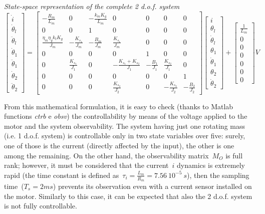 \textit{State-space representation of the complete 2 d.o.f. system}
\begin{equation}
	\begin{bmatrix}
		\dot{i} \\
		\dot{\theta}_l \\
		\ddot{\theta}_l \\
		\dot{\theta}_1 \\
		\ddot{\theta}_1 \\
		\dot{\theta}_2 \\
		\ddot{\theta}_2
	\end{bmatrix}
	=
	\begin{bmatrix}
		-\frac{R_m}{L_m} & 0 & -\frac{k_m K_g}{L_m} & 0 & 0 & 0 & 0 \\
		0 & 0 &1 & 0 & 0 & 0 & 0 \\
		\frac{\eta_m \eta_g k_t K_g}{J_m} & -\frac{K_{s_1}}{J_m} & -\frac{B_m}{J_m} & \frac{K_{s_1}}{J_m} & 0 & 0 & 0 \\
		0 & 0 & 0 & 0 & 1 & 0 & 0 \\
		0 & \frac{K_{s_1}}{J_1} & 0 & -\frac{K_{s_1}+K_{s_2}}{J_1} & -\frac{B_1}{J_1} & \frac{K_{s_2}}{J_1} & 0 \\
		0 & 0 & 0 & 0 & 0 & 0 & 1 \\
		0 & 0 & 0 & \frac{K_{s_2}}{J_2} & 0 & -\frac{K_{s_2}}{J_2} & -\frac{B_2}{J_2}
	\end{bmatrix}
	\begin{bmatrix}
		i \\
		\theta_l \\
		\dot{\theta}_l \\
		\theta_1 \\
		\dot{\theta}_1 \\
		\theta_2 \\
		\dot{\theta}_2
	\end{bmatrix}
	+
	\begin{bmatrix}
		\frac{1}{L_m} \\
		0 \\
		0 \\
		0 \\
		0 \\
		0 \\
		0
	\end{bmatrix}
	V
\end{equation}

From this mathematical formulation, it is easy to check (thanks to Matlab functions  \textit{ctrb} e \textit{obsv}) the controllability by means of the voltage applied to the motor and the system observability.
The system having just one rotating mass (i.e. 1 d.o.f. system) is controllable only in two state variables over five: surely, one of those is the current (directly affected by the input), the other is one among the remaining. On the other hand, the observability matrix~$M_O$ is full rank; however, it must be considered that the current~$i$ dynamics is extremely rapid (the time constant is defined as~$\tau_i = \frac{L_m}{R_m} = 7.56\ 10^{-5} \ s$), then the sampling time~($T_s = 2 ms$) prevents its observation even with a current sensor installed on the motor.
Similarly to this case, it can be expected that also the 2 d.o.f. system is not fully controllable. \\

